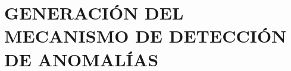 
\chapter{\uppercase{Generaci\'{o}n del mecanismo de detecci\'{o}n de anomal\'{i}as}}
\label{Capitulo 5}


